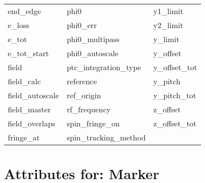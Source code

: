 \begin{tabular}{lll}
end_edge                    & phi0                        & y1_limit                    \\
e_loss                      & phi0_err                    & y2_limit                    \\
e_tot                       & phi0_multipass              & y_limit                     \\
e_tot_start                 & phi0_autoscale                    & y_offset                    \\
field                       & ptc_integration_type        & y_offset_tot                \\
field_calc                  & reference                   & y_pitch                     \\
field_autoscale                & ref_origin                  & y_pitch_tot                 \\
field_master                & rf_frequency                & z_offset                    \\
field_overlaps              & spin_fringe_on              & z_offset_tot                \\
fringe_at                   & spin_tracking_method        &                             \\
 \bottomrule
 \end{tabular}
 \vfill
 
 \section{Attributes for: Marker}
 \label{s:list.marker}
 
